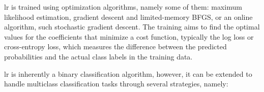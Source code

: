 



\gls{lr} is trained using optimization algorithms, namely some of them: maximum likelihood estimation, gradient descent and limited-memory BFGS, or an online algorithm, such stochastic gradient descent. The training aims to find the optimal values for the coefficients that minimize a cost function, typically the log loss or cross-entropy loss, which measures the difference between the predicted probabilities and the actual class labels in the training data.


\gls{lr} is inherently a binary classification algorithm, however, it can be extended to handle multiclass classification tasks through several strategies, namely:

